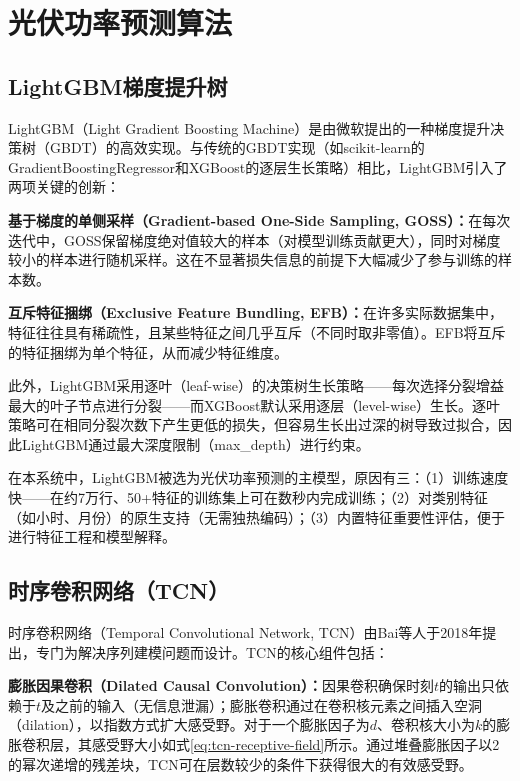 \documentclass[12pt,a4paper]{ctexbook}
\begin{document}
\section{光伏功率预测算法}

\subsection{LightGBM梯度提升树}

LightGBM（Light Gradient Boosting Machine）是由微软提出的一种梯度提升决策树（GBDT）的高效实现\cite{lightgbm-2017}。与传统的GBDT实现（如scikit-learn的GradientBoostingRegressor和XGBoost的逐层生长策略）相比，LightGBM引入了两项关键的创新：

\textbf{基于梯度的单侧采样（Gradient-based One-Side Sampling, GOSS）：}在每次迭代中，GOSS保留梯度绝对值较大的样本（对模型训练贡献更大），同时对梯度较小的样本进行随机采样。这在不显著损失信息的前提下大幅减少了参与训练的样本数。

\textbf{互斥特征捆绑（Exclusive Feature Bundling, EFB）：}在许多实际数据集中，特征往往具有稀疏性，且某些特征之间几乎互斥（不同时取非零值）。EFB将互斥的特征捆绑为单个特征，从而减少特征维度。

此外，LightGBM采用逐叶（leaf-wise）的决策树生长策略——每次选择分裂增益最大的叶子节点进行分裂——而XGBoost默认采用逐层（level-wise）生长。逐叶策略可在相同分裂次数下产生更低的损失，但容易生长出过深的树导致过拟合，因此LightGBM通过最大深度限制（max\_depth）进行约束。

在本系统中，LightGBM被选为光伏功率预测的主模型，原因有三：（1）训练速度快——在约7万行、50+特征的训练集上可在数秒内完成训练；（2）对类别特征（如小时、月份）的原生支持（无需独热编码）；（3）内置特征重要性评估，便于进行特征工程和模型解释。

\subsection{时序卷积网络（TCN）}

时序卷积网络（Temporal Convolutional Network, TCN）由Bai等人于2018年提出\cite{tcn-wan-2019}，专门为解决序列建模问题而设计。TCN的核心组件包括：

\textbf{膨胀因果卷积（Dilated Causal Convolution）：}因果卷积确保时刻$t$的输出只依赖于$t$及之前的输入（无信息泄漏）；膨胀卷积通过在卷积核元素之间插入空洞（dilation），以指数方式扩大感受野。对于一个膨胀因子为$d$、卷积核大小为$k$的膨胀卷积层，其感受野大小如式\ref{eq:tcn-receptive-field}所示。通过堆叠膨胀因子以2的幂次递增的残差块，TCN可在层数较少的条件下获得很大的有效感受野。
\end{document}
